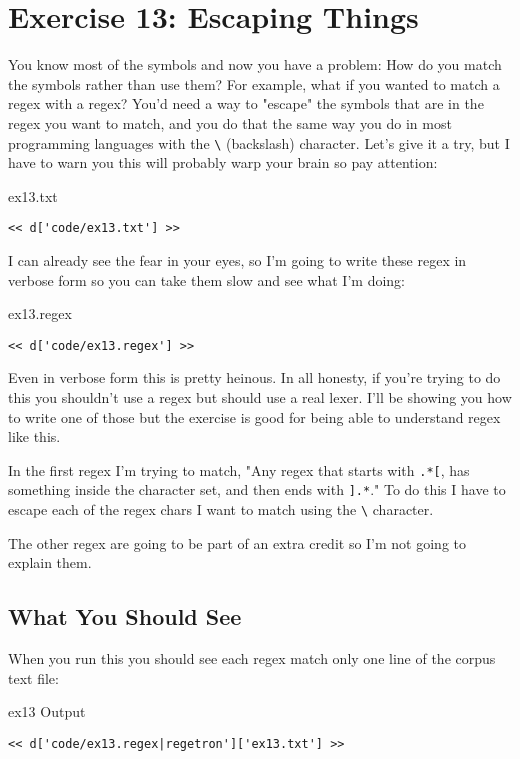 \chapter{Exercise 13: Escaping Things}

You know most of the symbols and now you have a problem:  How do you match
the symbols rather than use them?  For example, what if you wanted to match a
regex with a regex?  You'd need a way to "escape" the symbols that are in the
regex you want to match, and you do that the same way you do in most
programming languages with the \verb|\| (backslash) character.  Let's give
it a try, but I have to warn you this will probably warp your brain so pay
attention:

\begin{code}{ex13.txt}
\begin{Verbatim}
<< d['code/ex13.txt'] >>
\end{Verbatim}
\end{code}

I can already see the fear in your eyes, so I'm going to write these regex
in verbose form so you can take them slow and see what I'm doing:

\begin{code}{ex13.regex}
\begin{Verbatim}
<< d['code/ex13.regex'] >>
\end{Verbatim}
\end{code}

Even in verbose form this is pretty heinous.  In all honesty, if you're
trying to do this you shouldn't use a regex but should use a real lexer.
I'll be showing you how to write one of those but the exercise is good for
being able to understand regex like this.

In the first regex I'm trying to match, "Any regex that starts with \verb|.*[|,
has something inside the character set, and then ends with \verb|].*|."  To do
this I have to escape each of the regex chars I want to match using the \verb|\|
character.

The other regex are going to be part of an extra credit so I'm not going to
explain them.

\section{What You Should See}

When you run this you should see each regex match only one line of the corpus
text file:

\begin{code}{ex13 Output}
\begin{Verbatim}
<< d['code/ex13.regex|regetron']['ex13.txt'] >>
\end{Verbatim}
\end{code}

